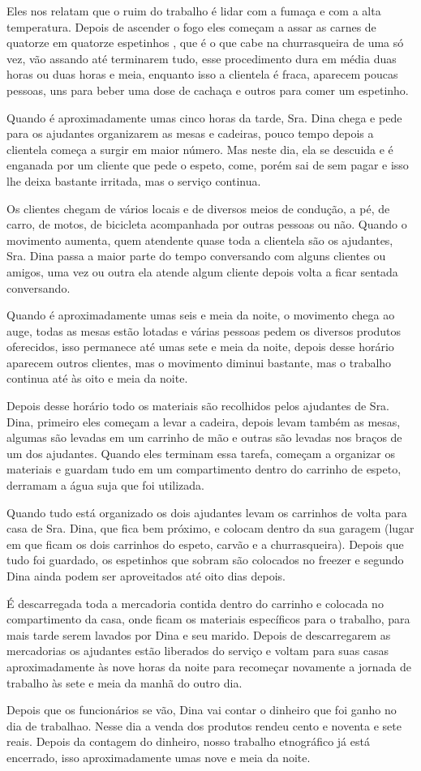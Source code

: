 Eles nos relatam que o ruim do trabalho é lidar com a fumaça e com a alta temperatura. Depois de ascender o fogo eles começam a assar as carnes de quatorze em quatorze espetinhos , que é o que cabe na churrasqueira de uma só vez, vão assando até terminarem tudo, esse procedimento dura em média duas horas ou duas horas e meia, enquanto isso a clientela é fraca, aparecem poucas pessoas, uns para beber uma dose de cachaça e outros para comer um espetinho.

Quando é aproximadamente umas cinco horas da tarde, Sra. Dina chega e pede para os ajudantes organizarem as mesas e cadeiras, pouco tempo depois a clientela começa a surgir em maior número. Mas neste dia, ela se descuida e é enganada por um cliente que pede o espeto, come, porém sai de sem pagar e isso lhe deixa bastante irritada, mas o serviço continua.

Os clientes chegam de vários locais e de diversos meios de condução, a pé, de carro, de motos, de bicicleta acompanhada por outras pessoas ou não. Quando o movimento aumenta, quem atendente quase toda a clientela são os ajudantes, Sra. Dina passa a maior parte do tempo conversando com alguns clientes ou amigos, uma vez ou outra ela atende algum cliente depois volta a ficar sentada conversando. 

Quando é aproximadamente umas seis e meia da noite, o movimento chega ao auge, todas as mesas estão lotadas e várias pessoas pedem os diversos produtos oferecidos, isso permanece até umas sete e meia da noite, depois desse horário aparecem outros clientes, mas o movimento diminui bastante, mas o trabalho continua até às oito e meia da noite.

Depois desse horário todo os materiais são recolhidos pelos ajudantes de Sra. Dina, primeiro eles começam a levar a cadeira, depois levam também as mesas, algumas são levadas em um carrinho de mão e outras são levadas nos braços de um dos ajudantes. Quando eles terminam essa tarefa, começam a organizar os materiais e guardam tudo em um compartimento dentro do carrinho de espeto, derramam a água suja que foi utilizada.

Quando tudo está organizado os dois ajudantes levam os carrinhos de volta para casa de Sra. Dina, que fica bem próximo, e colocam dentro da sua garagem (lugar em que ficam os dois carrinhos do espeto, carvão e a churrasqueira). Depois que tudo foi guardado, os espetinhos que sobram são colocados no freezer e segundo Dina ainda podem ser aproveitados até oito dias depois. 

É descarregada toda a mercadoria contida dentro do carrinho e colocada no compartimento da casa, onde ficam os materiais específicos para o trabalho, para mais tarde serem lavados por Dina e seu marido. Depois de descarregarem as mercadorias os ajudantes estão liberados do serviço e voltam para suas casas aproximadamente às nove horas da noite para recomeçar novamente a jornada de trabalho às sete e meia da manhã do outro dia.

Depois que os funcionários se vão, Dina vai contar o dinheiro que foi ganho no dia de trabalhao. Nesse dia a venda dos produtos rendeu cento e noventa e sete reais. Depois da contagem do dinheiro, nosso trabalho etnográfico já está encerrado, isso aproximadamente umas nove e meia da noite.